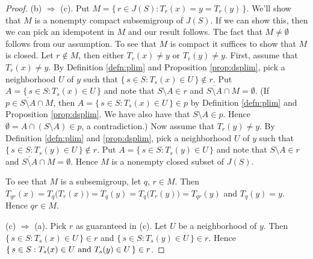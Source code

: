 \documentclass[12pt]{article}
\theoremstyle{plain}
\theoremstyle{definition}
\begin{document}
\begin{proof}
    (b) $\Rightarrow$ (c).
    Put $M  = \{\, r \in J(S) : T_r(x) = y = T_r(y) \,\}$. 
    We'll show that $M$ is a nonempty compact subsemigroup of $J(S)$. 
    If we can show this, then we can pick an idempotent in $M$ and our
    result follows.
    The fact that $M \ne \emptyset$ follows from our assumption. 
    To see that $M$ is compact it suffices to show that $M$ is
    closed. 
    Let $r \not\in M$, then either $T_r(x) \ne y$ or $T_r(y) \ne y$. 
    First, assume that $T_r(x) \ne y$. 
    By Definition \ref{defn:plim} and Proposition \ref{prop:dsplim},
    pick a
    neighborhood $U$ of $y$ such that 
    $\{\, s \in S : T_s(x) \in U \,\} \not\in r$.
    Put $A = \{\, s \in S : T_s(x) \in U \,\}$ and note that $S
    \setminus A \in r$ and $\overline{S \setminus A} \cap M =
    \emptyset$.
    (If $p \in \overline{S \setminus A} \cap M$, then $A = \{\, s \in
    S : T_s(x) \in U \,\} \in p$ by Definition \ref{defn:plim} and
    Proposition \ref{prop:dsplim}.
    We have also have that $S \setminus A \in p$.
    Hence $\emptyset = A \cap (S \setminus A) \in p$, a
    contradiction.)
    Now assume that $T_r(y) \ne y$. 
    By Definition \ref{defn:plim} and \ref{prop:dsplim}, pick a
    neighborhood $U$ of $y$ such that
    $\{\, s \in S : T_s(y) \in U \,\} \not\in r$.
    Put $A = \{\, s \in S : T_s(y) \in U \,\}$ and note that $S
    \setminus A \in r$ and $\overline{S \setminus A} \cap M =
    \emptyset$.
    Hence $M$ is a nonempty closed subset of $J(S)$.

    To see that $M$ is a subsemigroup, let $q$, $r \in M$.
    Then $T_{qr}(x) = T_q\bigl(T_r(x)\bigr) = T_q(y) =
    T_q\bigl(T_r(y)\bigr) = T_{qr}(y)$ and $T_q(y) = y$. 
    Hence $qr \in M$. 
    
    (c) $\Rightarrow$ (a).
    Pick $r$ as guaranteed in (c). 
    Let $U$ be a neighborhood of $y$. 
    Then $\{\, s \in S : T_s(x) \in U \,\} \in r$ and $\{\,  s \in S :
    T_s(y) \in U \,\} \in r$.
    Hence $\{\, s \in S : \hbox{$T_s(x) \in U$ and $T_s(y) \in U$}
    \,\} \in r$.  
  \end{proof}
\end{document}
